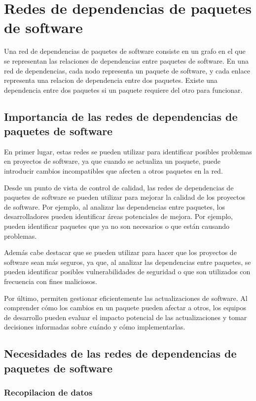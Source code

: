 \section{Redes de dependencias de paquetes de software}

Una red de dependencias de paquetes de software consiste en un grafo en el que se representan las relaciones de dependencias entre paquetes de software. En una red de dependencias, cada nodo representa un paquete de software, y cada enlace representa una relacion de dependencia entre dos paquetes. Existe una dependencia entre dos paquetes si un paquete requiere del otro para funcionar.

\subsection{Importancia de las redes de dependencias de paquetes de software}
En primer lugar, estas redes se pueden utilizar para identificar posibles problemas en proyectos de software, ya que cuando se actualiza un paquete, puede introducir cambios incompatibles que afecten a otros paquetes en la red.

Desde un punto de vista de control de calidad, las redes de dependencias de paquetes de software se pueden utilizar para mejorar la calidad de los proyectos de software. Por ejemplo, al analizar las dependencias entre paquetes, los desarrolladores pueden identificar áreas potenciales de mejora. Por ejemplo, pueden identificar paquetes que ya no son necesarios o que están causando problemas.

Además cabe destacar que se pueden utilizar para hacer que los proyectos de software sean más seguros, ya que, al analizar las dependencias entre paquetes, se pueden identificar posibles vulnerabilidades de seguridad o que son utilizados con frecuencia con fines maliciosos.

Por último, permiten gestionar eficientemente las actualizaciones de software. Al comprender cómo los cambios en un paquete pueden afectar a otros, los equipos de desarrollo pueden evaluar el impacto potencial de las actualizaciones y tomar decisiones informadas sobre cuándo y cómo implementarlas.

\subsection{Necesidades de las redes de dependencias de paquetes de software}

\subsubsection{Recopilacion de datos}

